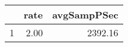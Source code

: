\begin{table}[h]
\centering
\begin{tabular}{rrr}
  \hline
 & rate & avgSampPSec \\ 
  \hline
1 & 2.00 & 2392.16 \\ 
   \hline
\end{tabular}
\end{table}
